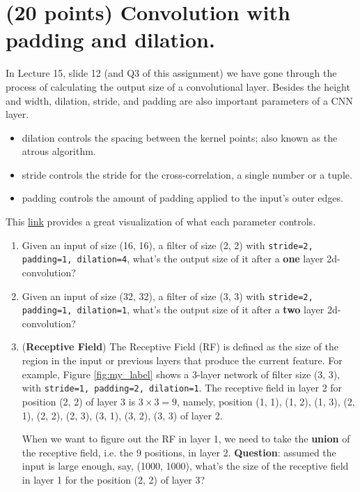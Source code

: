 \documentclass[12pt]{article}%
\begin{document}
\section{(20 points) Convolution with padding and dilation.}
In Lecture 15, slide 12 (and Q3 of this assignment) we have gone through the process of calculating the output size of a convolutional layer. Besides the height and width, dilation, stride, and padding are also important parameters of a CNN layer. 
\begin{itemize}
    \item dilation controls the spacing between the kernel points; also known as the atrous algorithm.
    \item stride controls the stride for the cross-correlation, a single number or a tuple.
    \item padding controls the amount of padding applied to the input's outer edges.
\end{itemize}
This \hyperlink{https://github.com/vdumoulin/conv_arithmetic/blob/master/README.md}{link} provides a great visualization of what each parameter controls.


\begin{enumerate}
    \item Given an input of size (16, 16), a filter of size (2, 2) with \texttt{stride=2, padding=1, dilation=4}, what's the output size of it after a \textbf{one} layer 2d-convolution?
    \item Given an input of size (32, 32), a filter of size (3, 3) with \texttt{stride=2, padding=1, dilation=1}, what's the output size of it after a \textbf{two} layer 2d-convolution?
    \item (\textbf{Receptive Field}) The Receptive Field (RF) is defined as the size of the region in the input or previous layers that produce the current feature. For example, Figure \ref{fig:my_label} shows a 3-layer network of filter size (3, 3), with \texttt{stride=1, padding=2, dilation=1}. The receptive field in layer 2 for position (2, 2) of layer 3 is  $3 \times 3=9$, namely, position (1, 1), (1, 2), (1, 3), (2, 1), (2, 2), (2, 3), (3, 1), (3, 2), (3, 3) of layer 2.
    
    When we want to figure out the RF in layer 1, we need to take the \textbf{union} of the receptive field, i.e. the 9 positions, in layer 2. \textbf{Question}: assumed the input is large enough, say, (1000, 1000), what's the size of the receptive field in layer 1 for the position (2, 2) of layer 3? 
\end{enumerate}
\end{document}
